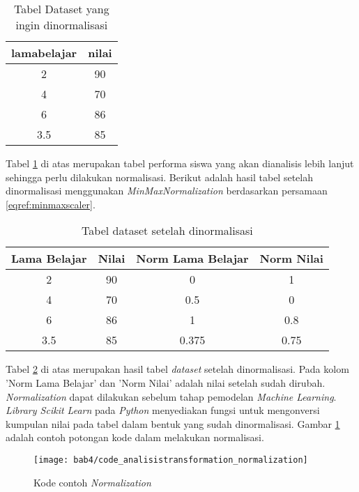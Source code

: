 \begin{table}[H]
\caption{Tabel Dataset yang ingin dinormalisasi} 
\centering
\begin{tabular}{|c|c|}
\hline 
lamabelajar & nilai \\ 
\hline 
2 & 90 \\ 
\hline 
4 & 70 \\ 
\hline 
6 & 86 \\ 
\hline 
3.5 & 85 \\ 
\hline 
\end{tabular} 
\label{tab:tabelprenormalisasi}
\end{table}

Tabel \ref{tab:tabelprenormalisasi} di atas merupakan tabel performa siswa yang akan dianalisis lebih lanjut sehingga perlu dilakukan normalisasi. Berikut adalah hasil tabel setelah dinormalisasi menggunakan \textit{MinMaxNormalization} berdasarkan persamaan \eqref{eqref:minmaxscaler}. 

\begin{table}[H]
\caption{Tabel dataset setelah dinormalisasi}
\centering
\begin{tabular}{|c|c|c|c|}
\hline 
Lama Belajar & Nilai & Norm Lama Belajar & Norm Nilai \\ 
\hline 
2 & 90 & 0 & 1 \\ 
\hline 
4 & 70 & 0.5 & 0 \\ 
\hline 
6 & 86 & 1 & 0.8 \\ 
\hline 
3.5 & 85 & 0.375 & 0.75 \\ 
\hline 
\end{tabular} 
\label{tab:tabelposnormalisasi}
\end{table}

Tabel \ref{tab:tabelposnormalisasi} di atas merupakan hasil tabel \textit{dataset} setelah dinormalisasi. Pada kolom 'Norm Lama Belajar' dan 'Norm Nilai' adalah nilai setelah sudah dirubah. \textit{Normalization} dapat dilakukan sebelum tahap pemodelan \textit{Machine Learning}. \textit{Library Scikit Learn} pada \textit{Python} menyediakan fungsi untuk mengonversi kumpulan nilai pada tabel dalam bentuk yang sudah dinormalisasi. Gambar \ref{fig:code_analisistransformation_normalization} adalah contoh potongan kode dalam melakukan normalisasi.


\begin{figure}[H]
	\centering  
	\texttt{[image: bab4/code\_analisistransformation\_normalization]}   
	\caption{Kode contoh \textit{Normalization}}
	\label{fig:code_analisistransformation_normalization} 
\end{figure} 


